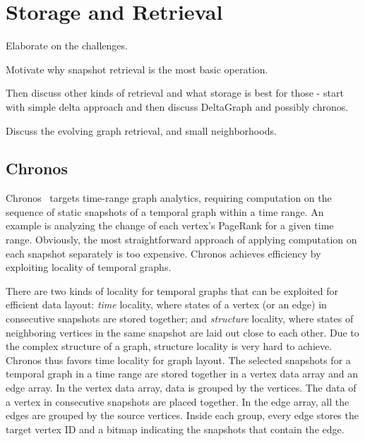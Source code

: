 \documentclass{svjour3}
\begin{document}
\section{Storage and Retrieval}
Elaborate on the challenges.

Motivate why snapshot retrieval is the most basic operation. 

Then discuss other kinds of retrieval and what storage is best for those - start with simple delta approach and then discuss DeltaGraph and possibly chronos.

Discuss the evolving graph retrieval, and small neighborhoods.

\subsection{Chronos}\label{sec:chronos}

Chronos~\cite{chronos} targets time-range graph analytics, requiring computation on the sequence of static snapshots of a temporal graph within a time range. An example is analyzing the change of each vertex's PageRank for a given time range. Obviously, the most straightforward approach of applying computation on each snapshot separately is too expensive. Chronos achieves efficiency by exploiting locality of temporal graphs.

\vspace{2mm}

 There are two kinds of locality for temporal graphs that can be exploited for efficient data layout: \emph{time} locality, where states of a vertex (or an edge) in consecutive snapshots are stored together; and \emph{structure} locality, where states of neighboring vertices in the same snapshot are laid out close to each other. Due to the complex structure of a graph, structure locality is very hard to achieve. Chronos thus favors time locality for graph layout. The selected snapshots for a temporal graph in a time range are stored together in a vertex data array and an edge array. In the vertex data array, data is grouped by the vertices. The data of a vertex in consecutive snapshots are placed together. In the edge array, all the edges are grouped by the source vertices. Inside each group, every edge stores the target vertex ID and a bitmap indicating the snapshots that contain the edge. 
\end{document}
